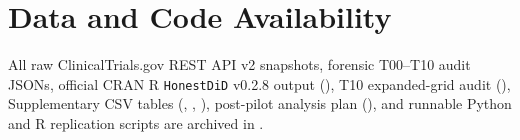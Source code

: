 \documentclass[11pt,letterpaper]{article}
\begin{document}
\section*{Data and Code Availability}
{\sloppy
All raw ClinicalTrials.gov REST API v2 snapshots, forensic T00--T10 audit JSONs, official CRAN R \texttt{HonestDiD} v0.2.8 output (), T10 expanded-grid audit (), Supplementary CSV tables (, , ), post-pilot analysis plan (), and runnable Python and R replication scripts are archived in .\par}



\end{document}
